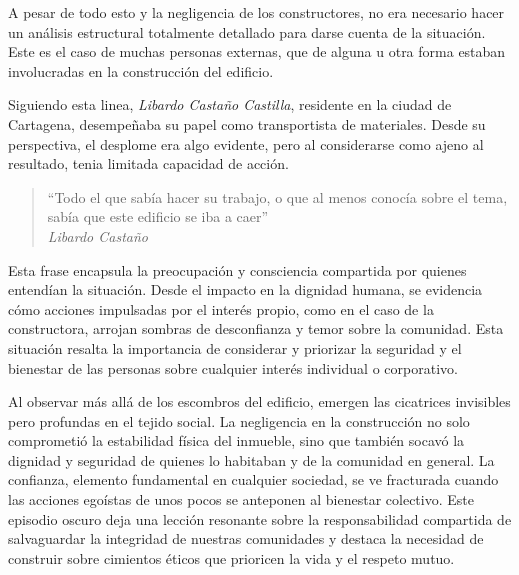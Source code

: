 \documentclass[letterpaper, 12pt]{article}
\begin{document}


A pesar de todo esto y la negligencia de los constructores,
no era necesario hacer un análisis estructural totalmente
detallado para darse cuenta de la situación. Este es el
caso de muchas personas externas, que de alguna u otra
forma estaban involucradas en la construcción del edificio.

Siguiendo esta linea, \textit{Libardo Castaño Castilla},
residente en la ciudad de Cartagena, desempeñaba su papel
como transportista de materiales. Desde su perspectiva, el
desplome era algo evidente, pero al considerarse como ajeno
al resultado, tenia limitada capacidad de acción.

\begin{quote}
      ``Todo el que sabía hacer su trabajo, o que al menos conocía
      sobre el tema, sabía que este edificio se iba a caer'' \\
      \textit{Libardo Castaño}
\end{quote}

Esta frase encapsula la preocupación y consciencia
compartida por quienes entendían la situación. Desde el
impacto en la dignidad humana, se evidencia cómo acciones
impulsadas por el interés propio, como en el caso de la
constructora, arrojan sombras de desconfianza y temor sobre
la comunidad. Esta situación resalta la importancia de
considerar y priorizar la seguridad y el bienestar de las
personas sobre cualquier interés individual o corporativo.

Al observar más allá de los escombros del edificio, emergen
las cicatrices invisibles pero profundas en el tejido
social. La negligencia en la construcción no solo
comprometió la estabilidad física del inmueble, sino que
también socavó la dignidad y seguridad de quienes lo
habitaban y de la comunidad en general. La confianza,
elemento fundamental en cualquier sociedad, se ve
fracturada cuando las acciones egoístas de unos pocos se
anteponen al bienestar colectivo. Este episodio oscuro deja
una lección resonante sobre la responsabilidad compartida
de salvaguardar la integridad de nuestras comunidades y
destaca la necesidad de construir sobre cimientos éticos
que prioricen la vida y el respeto mutuo.

\printbibliography
\end{document}
